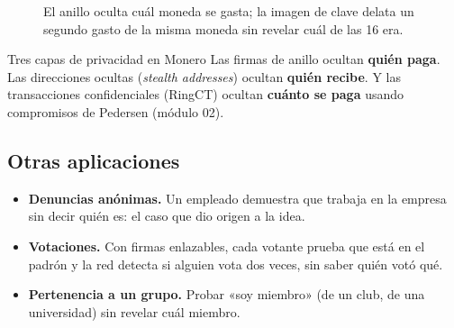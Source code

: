 \documentclass[11pt,a4paper]{article}
\theoremstyle{definition}
\theoremstyle{plain}
\theoremstyle{remark}
\begin{document}
\begin{figure}[htbp]
\centering
{}
\caption{El anillo oculta cuál moneda se gasta; la imagen de clave delata un
segundo gasto de la misma moneda sin revelar cuál de las 16 era.}
\label{fig:monero}
\end{figure}

\begin{caso}{Tres capas de privacidad en Monero}
Las firmas de anillo ocultan \textbf{quién paga}. Las direcciones ocultas
(\emph{stealth addresses}) ocultan \textbf{quién recibe}. Y las transacciones
confidenciales (RingCT) ocultan \textbf{cuánto se paga} usando compromisos de
Pedersen (módulo 02).
\end{caso}

\subsection{Otras aplicaciones}

\begin{itemize}[leftmargin=1.6em,itemsep=0.3em]
  \item \textbf{Denuncias anónimas.} Un empleado demuestra que trabaja en la empresa
    sin decir quién es: el caso que dio origen a la idea.
  \item \textbf{Votaciones.} Con firmas enlazables, cada votante prueba que está en el
    padrón y la red detecta si alguien vota dos veces, sin saber quién votó qué.
  \item \textbf{Pertenencia a un grupo.} Probar «soy miembro» (de un club, de una
    universidad) sin revelar cuál miembro.
\end{itemize}
\end{document}
